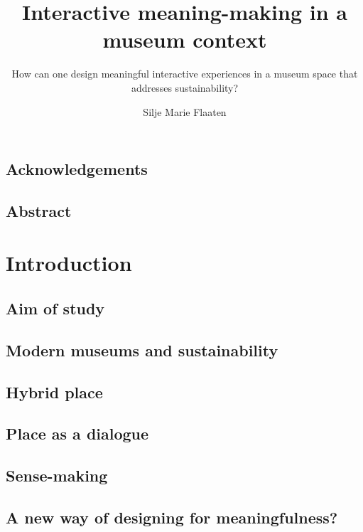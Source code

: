 \documentclass[UKenglish]{ifimaster}
\title{Interactive meaning-making in a museum context}
\subtitle{How can one design meaningful interactive experiences in a museum space that addresses sustainability?}
\author{Silje Marie Flaaten}
\begin{document}
\duoforside[dept={Department of Informatics}, program={Informatics: design, use, interaction},long]
\frontmatter{}

\chapter*{Acknowledgements}


\chapter*{Abstract}


\tableofcontents{}
\listoffigures{}
\listoftables{}

\mainmatter{}

\part{Introduction}

\chapter{Aim of study}


\chapter{Modern museums and sustainability}



\chapter{Hybrid place}


\chapter{Place as a dialogue}


\chapter{Sense-making}


\chapter{A new way of designing for meaningfulness?}

\end{document}
